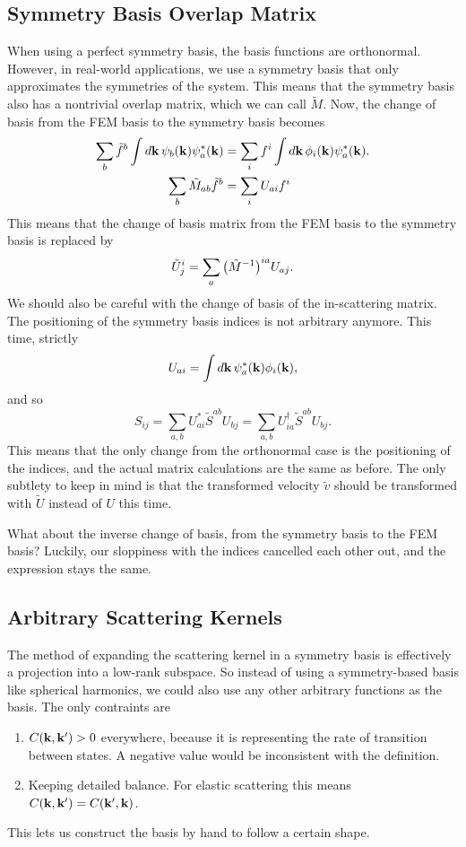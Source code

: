 \documentclass[12pt]{article}
\begin{document}
\subsection{Symmetry Basis Overlap Matrix}
When using a perfect symmetry basis, the basis functions are orthonormal. However, in real-world
applications, we use a symmetry basis that only approximates the symmetries of the system. This
means that the symmetry basis also has a nontrivial overlap matrix, which we can call $\tilde{M}$.
Now, the change of basis from the FEM basis to the symmetry basis becomes
\begin{align}
    \sum_b\tilde{f}^b\int\dd{\vb{k}}\psi_b(\vb{k})\psi_a^*(\vb{k})
    &= \sum_i f^i \int\dd{\vb{k}}\phi_i(\vb{k}) \psi_a^*(\vb{k}). \\
    \sum_b\tilde{M}_{ab} \tilde{f}^b &= \sum_i U_{ai} f^i
\end{align}
This means that the change of basis matrix from the FEM basis to the symmetry basis is
replaced by
\begin{equation}
    \tilde{U}^i_j = \sum_a \qty(\tilde{M}^{-1})^{ia} U_{aj}.
\end{equation}
We should also be careful with the change of basis of the in-scattering matrix. The positioning of
the symmetry basis indices is not arbitrary anymore. This time, strictly
\begin{equation}
    U_{ai} = \int\dd{\vb{k}}\psi_a^*(\vb{k})\phi_i(\vb{k}),
\end{equation}
and so
\begin{equation}
    S_{ij} = \sum_{a,b} U^*_{ai} \tilde{S}^{ab} U_{bj}
    = \sum_{a,b} U^\dagger_{ia} \tilde{S}^{ab} U_{bj}.
\end{equation}
This means that the only change from the orthonormal case is the positioning of the indices, and
the actual matrix calculations are the same as before. The only subtlety to keep in mind is that
the transformed velocity $\tilde{v}$ should be transformed with $\tilde{U}$ instead of $U$ this
time.

What about the inverse change of basis, from the symmetry basis to the FEM basis? Luckily, our
sloppiness with the indices cancelled each other out, and the expression stays the same.

\subsection{Arbitrary Scattering Kernels}
The method of expanding the scattering kernel in a symmetry basis is effectively a projection into
a low-rank subspace. So instead of using a symmetry-based basis like spherical harmonics, we could
also use any other arbitrary functions as the basis. The only contraints are
\begin{enumerate}
    \item $C(\vb{k}, \vb{k'}) > 0$ everywhere, because it is representing the rate of
        transition between states. A negative value would be inconsistent with the definition.
    \item Keeping detailed balance. For elastic scattering this means
        $C(\vb{k}, \vb{k'}) = C(\vb{k'}, \vb{k})$.
\end{enumerate}
This lets us construct the basis by hand to follow a certain shape.
\end{document}
